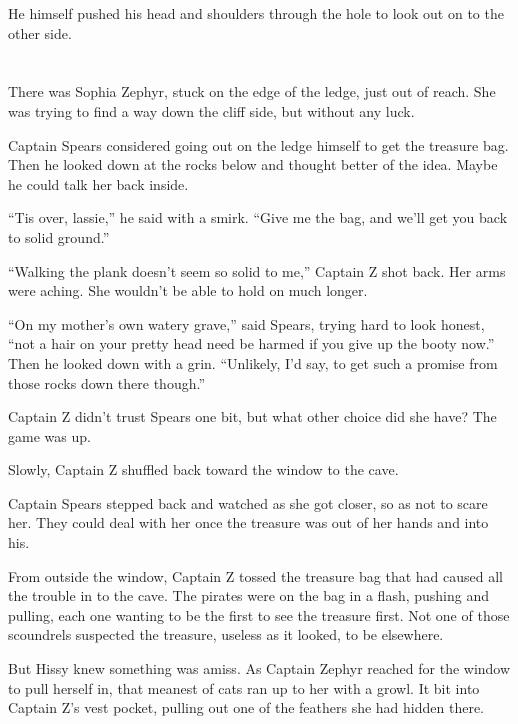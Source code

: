 \documentclass[12pt]{extbook}
\begin{document}
  He himself pushed his head and shoulders through the hole to look out on
  to the other side.
  
  \section{}\label{section-21}
  
  There was Sophia Zephyr, stuck on the edge of the ledge, just out of
  reach. She was trying to find a way down the cliff side, but without any
  luck.
  
  Captain Spears considered going out on the ledge himself to get the
  treasure bag. Then he looked down at the rocks below and thought better
  of the idea. Maybe he could talk her back inside.
  
  \enquote{Tis over, lassie,} he said with a smirk. \enquote{Give me the
  bag, and we'll get you back to solid ground.}
  
  \enquote{Walking the plank doesn't seem so solid to me,} Captain Z shot
  back. Her arms were aching. She wouldn't be able to hold on much longer.
  
  \enquote{On my mother's own watery grave,} said Spears, trying hard to
  look honest, \enquote{not a hair on your pretty head need be harmed if
  you give up the booty now.} Then he looked down with a grin.
  \enquote{Unlikely, I'd say, to get such a promise from those rocks down
  there though.}
  
  Captain Z didn't trust Spears one bit, but what other choice did she
  have? The game was up.
  
  Slowly, Captain Z shuffled back toward the window to the cave.
  
  Captain Spears stepped back and watched as she got closer, so as not to
  scare her. They could deal with her once the treasure was out of her
  hands and into his.
  
  From outside the window, Captain Z tossed the treasure bag that had
  caused all the trouble in to the cave. The pirates were on the bag in a
  flash, pushing and pulling, each one wanting to be the first to see the
  treasure first. Not one of those scoundrels suspected the treasure,
  useless as it looked, to be elsewhere.
  
  But Hissy knew something was amiss. As Captain Zephyr reached for the
  window to pull herself in, that meanest of cats ran up to her with a
  growl. It bit into Captain Z's vest pocket, pulling out one of the
  feathers she had hidden there.
  
\end{document}
